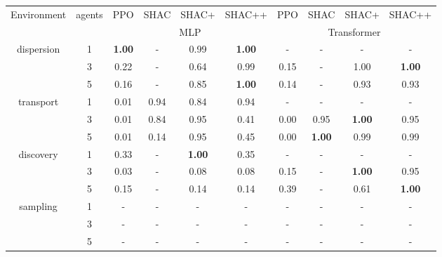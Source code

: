 \begin{tabular}{ c c c c c c c c c c }
\toprule
\multirow{2}{*}{Environment} & \multirow{2}{*}{agents} & PPO & SHAC & SHAC+ & SHAC++ & PPO & SHAC & SHAC+ & SHAC++ \\
 & & \multicolumn{4}{c}{MLP} & \multicolumn{4}{c}{Transformer} \\
\midrule
\multirow{3}{*}{dispersion}& 1 & \textbf{1.00} & - & 0.99 & \textbf{1.00} & - & - & - & - \\
& 3 & 0.22 & - & 0.64 & 0.99 & 0.15 & - & 1.00 & \textbf{1.00} \\
& 5 & 0.16 & - & 0.85 & \textbf{1.00} & 0.14 & - & 0.93 & 0.93 \\
\multirow{3}{*}{transport}& 1 & 0.01 & 0.94 & 0.84 & 0.94 & - & - & - & - \\
& 3 & 0.01 & 0.84 & 0.95 & 0.41 & 0.00 & 0.95 & \textbf{1.00} & 0.95 \\
& 5 & 0.01 & 0.14 & 0.95 & 0.45 & 0.00 & \textbf{1.00} & 0.99 & 0.99 \\
\multirow{3}{*}{discovery}& 1 & 0.33 & - & \textbf{1.00} & 0.35 & - & - & - & - \\
& 3 & 0.03 & - & 0.08 & 0.08 & 0.15 & - & \textbf{1.00} & 0.95 \\
& 5 & 0.15 & - & 0.14 & 0.14 & 0.39 & - & 0.61 & \textbf{1.00} \\
\multirow{3}{*}{sampling}& 1 & - & - & - & - & - & - & - & - \\
& 3 & - & - & - & - & - & - & - & - \\
& 5 & - & - & - & - & - & - & - & - \\
\bottomrule
\end{tabular}
